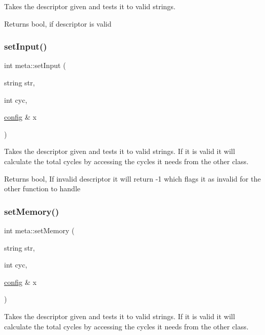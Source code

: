 Takes the descriptor given and tests it to valid strings. 

\begin{DoxyReturn}{Returns}
bool, if descriptor is valid 
\end{DoxyReturn}
\mbox{\label{classmeta_a64ab5feab351ac0611c9db92ac319e87}} 
\subsubsection{\texorpdfstring{setInput()}{setInput()}}
{\footnotesize\ttfamily int meta\+::set\+Input (\begin{DoxyParamCaption}\item[{string}]{str,  }\item[{int}]{cyc,  }\item[{\mbox{\hyperlink{classconfig}{config}} \&}]{x }\end{DoxyParamCaption})}



Takes the descriptor given and tests it to valid strings. If it is valid it will calculate the total cycles by accessing the cycles it needs from the other class. 

\begin{DoxyReturn}{Returns}
bool, If invalid descriptor it will return -\/1 which flags it as invalid for the other function to handle 
\end{DoxyReturn}
\mbox{\label{classmeta_a7134e9c2093c85766728b2418dab6c36}} 
\subsubsection{\texorpdfstring{setMemory()}{setMemory()}}
{\footnotesize\ttfamily int meta\+::set\+Memory (\begin{DoxyParamCaption}\item[{string}]{str,  }\item[{int}]{cyc,  }\item[{\mbox{\hyperlink{classconfig}{config}} \&}]{x }\end{DoxyParamCaption})}



Takes the descriptor given and tests it to valid strings. If it is valid it will calculate the total cycles by accessing the cycles it needs from the other class. 

